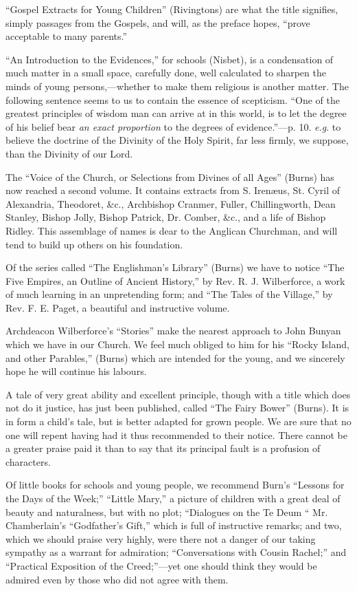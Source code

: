 ``Gospel Extracts for Young Children'' (Rivingtons)
are what the title signifies, simply passages from the Gospels, and
will, as the preface hopes, ``prove acceptable to many parents.''

``An Introduction to the Evidences,'' for schools (Nisbet),
is a condensation of much matter in a small space, carefully done, well
calculated to sharpen the minds of young persons,—whether to make them
religious is another matter. The following sentence seems to us to
contain the essence of scepticism. ``One of the greatest principles of
wisdom man can arrive at in this world, is to let the degree of his
belief bear \emph{an exact proportion} to the degrees of evidence.''—p.
10. \emph{e.g}. to believe the doctrine of the Divinity of the Holy
Spirit, far less firmly, we suppose, than the Divinity of our Lord.

The ``Voice of the Church, or Selections from
Divines of all Ages'' (Burns) has now reached a second volume. It
contains extracts from S. Irenæus, St. Cyril of Alexandria, Theodoret,
\&c., Archbishop Cranmer, Fuller, Chillingworth, Dean Stanley, Bishop
Jolly, Bishop Patrick, Dr. Comber, \&c., and a life of Bishop Ridley.
This assemblage of names is dear to the Anglican Churchman, and will
tend to build up others on his foundation.

Of the series called ``The Englishman's Library''
(Burns) we have to notice ``The Five Empires, an Outline of Ancient
History,'' by Rev. R. J. Wilberforce, a work of much learning in an
unpretending form; and ``The Tales of the Village,'' by Rev. F. E. Paget,
a beautiful and instructive volume.

Archdeacon Wilberforce's ``Stories'' make the nearest
approach to John Bunyan which we have in our Church. We feel much
obliged to him for his ``Rocky Island, and other Parables,'' (Burns) which
are intended for the young, and we sincerely hope he will continue his
labours.

A tale of very great ability and excellent
principle, though with a title which does not do it justice, has just
been published, called ``The Fairy Bower'' (Burns). It is in form a child's
tale, but is better adapted for grown people. We are sure that no one
will repent having had it thus recommended to their notice. There cannot
be a greater praise paid it than to say that its principal fault is a
profusion of characters.

Of little books for schools and young people, we
recommend Burn's ``Lessons for the Days of the Week;'' ``Little Mary,'' a
picture of children with a great deal of beauty and naturalness, but
with no plot; ``Dialogues on the Te Deum `` Mr. Chamberlain's ``Godfather's
Gift,'' which is full of instructive remarks; and two, which we should
praise very highly, were there not a danger of our taking sympathy as a
warrant for admiration; ``Conversations with Cousin Rachel;'' and ``Practical
Exposition of the Creed;''—yet one should think they would be admired
even by those who did not agree with them.

